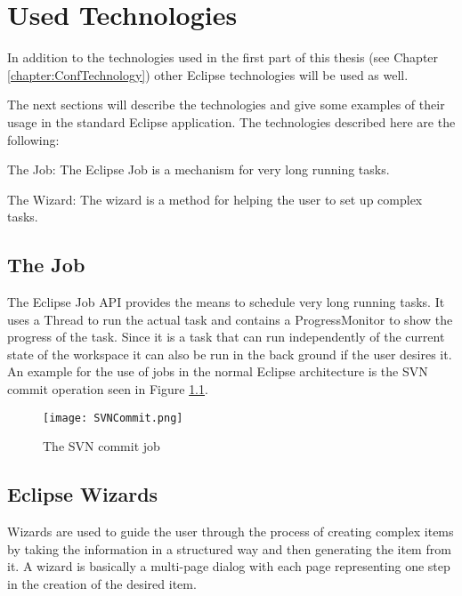 \chapter{Used Technologies}
\label{chapter:AutoTechnologies}

In addition to the technologies used in the first part of this
thesis (see Chapter \ref{chapter:ConfTechnology}) other Eclipse
technologies will be used as well.

The next sections will describe the technologies and give some
examples of their usage in the standard Eclipse application.
The technologies described here are the following:
\begin{description}
 \item The Job: The Eclipse Job is a mechanism for very long running tasks.
 \item The Wizard: The wizard is a method for helping the user to set up complex tasks.
\end{description}


\section{The Job}
\label{section:AutoTechJob}

The Eclipse Job \ac{API} provides the means to schedule very long running tasks.
It uses a Thread to run the actual task and contains a ProgressMonitor to show
the progress of the task. Since it is a task that can run independently of the
current state of the workspace it can also be run in the back ground if the user
desires it.
An example for the use of jobs in the normal Eclipse architecture
is the SVN commit operation seen in Figure \ref{fig:SVNCommit}.

\begin{figure}[SVNCommit]
  \centering
  \texttt{[image: SVNCommit.png]}
  \caption[The SVN commit job]%
  {The SVN commit job\protect}
  \label{fig:SVNCommit}
\end{figure}

\section{Eclipse Wizards}
\label{section:AutoTechWizards}
Wizards are used to guide the user through the process of creating complex items by taking
the information in a structured way and then generating the item from it. A wizard is 
basically a multi-page dialog with each page representing one step in the creation of the 
desired item.

